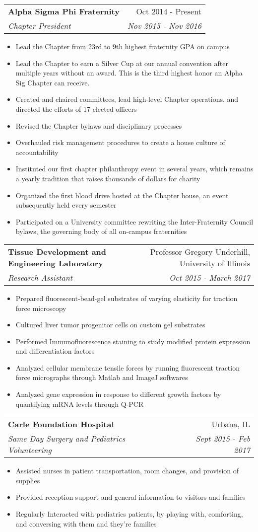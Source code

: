 \documentclass[letterpaper,10pt]{article}
\makeatletter
\newcommand{\resumeItemNoHeading}[1]{
  \item\small{
    {#1\vspace{-2pt}}
  }
}
\newcommand{\resumeSubheading}[4]{
  \vspace{1pt}\item
    \begin{tabular*}{0.97\textwidth}{l@{\extracolsep{\fill}}r}
      \textbf{#1} & #2 \\
      \textit{\small#3} & \textit{\footnotesize  #4} \\
    \end{tabular*}\vspace{-5pt}
}
\newcommand{\resumeItemListStart}{\begin{itemize}}
\newcommand{\resumeItemListEnd}{\end{itemize}\vspace{-5pt}}
\makeatother
\begin{document}
    \resumeSubheading
      {Alpha Sigma Phi Fraternity}{Oct 2014 - Present}{Chapter President}{Nov 2015 - Nov 2016}
      \resumeItemListStart
      	\resumeItemNoHeading {Lead the Chapter from 23rd to 9th highest fraternity GPA on campus} 
       	\resumeItemNoHeading {Lead the Chapter to earn a Silver Cup at our annual convention after multiple years without an award. This is the third highest honor an Alpha Sig Chapter can receive.}  
        \resumeItemNoHeading {Created and chaired committees, lead high-level Chapter operations, and directed the efforts of 17 elected officers} 
        \resumeItemNoHeading {Revised the Chapter bylaws and disciplinary processes} 
        \resumeItemNoHeading {Overhauled risk management procedures to create a house culture of accountability}
        \resumeItemNoHeading {Instituted our first chapter philanthropy event in several years, which remains a yearly tradition that raises thousands of dollars for charity}
        \resumeItemNoHeading {Organized the first blood drive hosted at the Chapter house, an event subsequently held every semester}
        \resumeItemNoHeading {Participated on a University committee rewriting the Inter-Fraternity Council bylaws, the governing body of all on-campus fraternities}    
      \resumeItemListEnd
      
       \resumeSubheading{Tissue Development and Engineering Laboratory}{Professor Gregory Underhill, University of Illinois}{Research Assistant}{Oct 2015 - March 2017}
      \resumeItemListStart
       	 \resumeItemNoHeading {Prepared fluorescent-bead-gel substrates of varying elasticity for traction force microscopy}%
         \resumeItemNoHeading {Cultured liver tumor progenitor cells on custom gel substrates}
         \resumeItemNoHeading {Performed Immunofluorescence staining to study modified protein expression and differentiation factors}
        	 \resumeItemNoHeading {Analyzed cellular membrane tensile forces by running fluorescent traction force micrographs through Matlab and ImageJ softwares}
         \resumeItemNoHeading {Analyzed gene expression in response to different growth factors by quantifying mRNA levels through Q-PCR}
       \resumeItemListEnd

      \resumeSubheading {Carle Foundation Hospital}{Urbana, IL}{Same Day Surgery and Pediatrics Volunteering}{Sept 2015 - Feb 2017}
      	\resumeItemListStart
        	  \resumeItemNoHeading {Assisted nurses in patient transportation, room changes, and provision of supplies}
           \resumeItemNoHeading {Provided reception support and general information to visitors and families}
           \resumeItemNoHeading {Regularly Interacted with pediatrics patients, by playing with, comforting, and conversing with them and they're families   }
       	\resumeItemListEnd
       
\end{document}
